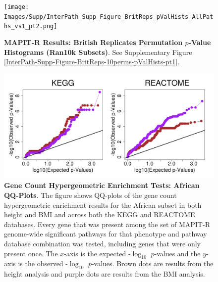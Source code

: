 \documentclass[12pt, a4paper]{article}
\begin{document}
\setlength{\footskip}{2cm}
\begin{figure}[htbp]
\centering
\vspace*{-1cm}
\texttt{[image: Images/Supp/InterPath\_Supp\_Figure\_BritReps\_pValHists\_AllPaths\_vs1\_pt2.png]}
\caption[TBD]{\textbf{MAPIT-R Results: British Replicates Permutation $p$-Value Histograms (Ran10k Subsets)}. See Supplementary Figure \ref{InterPath-Supp-Figure-BritReps-10perms-pValHists-pt1}.}
\label{InterPath-Supp-Figure-BritReps-10perms-pValHists-pt2}
\end{figure}
\clearpage
\setlength{\footskip}{1cm}
\renewcommand{\thefigure}{\arabic{figure}}

\begin{figure}[htbp]
\centering
\includegraphics[scale=.45]{Images/Supp/InterPath_Supp_Figure_Hypergeometric_QQPlots_African_vs1.png}
\caption[TBD]{\textbf{Gene Count Hypergeometric Enrichment Tests: African QQ-Plots}. The figure shows QQ-plots of the gene count hypergeometric enrichment results for the African subset in both height and BMI and across both the KEGG and REACTOME databases. Every gene that was present among the set of MAPIT-R genome-wide significant pathways for that phenotype and pathway database combination was tested, including genes that were only present once. The $x$-axis is the expected -$\log_{10}$ $p$-values and the $y$-axis is the observed -$\log_{10}$ $p$-values. Brown dots are results from the height analysis and purple dots are results from the BMI analysis.}
\label{InterPath-Supp-Figure-Hypergeometric-QQPlots-African}
\end{figure}
\clearpage
\end{document}
